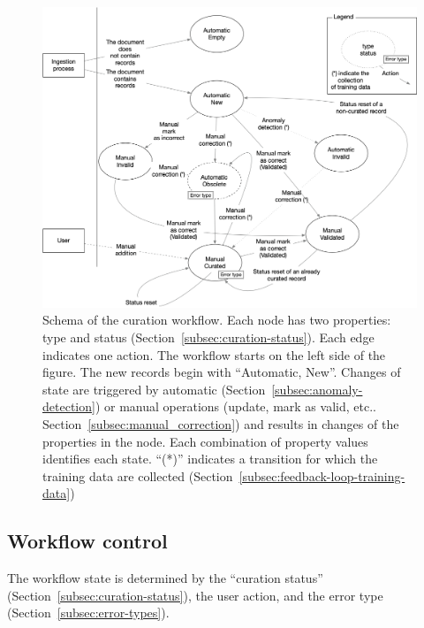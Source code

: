 \begin{figure}[htbp]
  \centering
  \includegraphics[width=1\textwidth]{figures/curation/record-correction} 
  \caption{Schema of the curation workflow. Each node has two properties: type and status (Section~\ref{subsec:curation-status}). Each edge indicates one action. The workflow starts on the left side of the figure. The new records begin with ``Automatic, New''. Changes of state are triggered by automatic (Section~\ref{subsec:anomaly-detection}) or manual operations (update, mark as valid, etc.. Section~\ref{subsec:manual_correction}) and results in changes of the properties in the node. Each combination of property values identifies each state. ``(*)'' indicates a transition for which the training data are collected (Section~\ref{subsec:feedback-loop-training-data})}
  \label{fig:curation-workflow}
\end{figure}


\subsection{Workflow control}
\label{subsec:workflow-control}
The workflow state is determined by the ``curation status'' (Section~\ref{subsec:curation-status}), the user action, and the error type (Section~\ref{subsec:error-types}).

